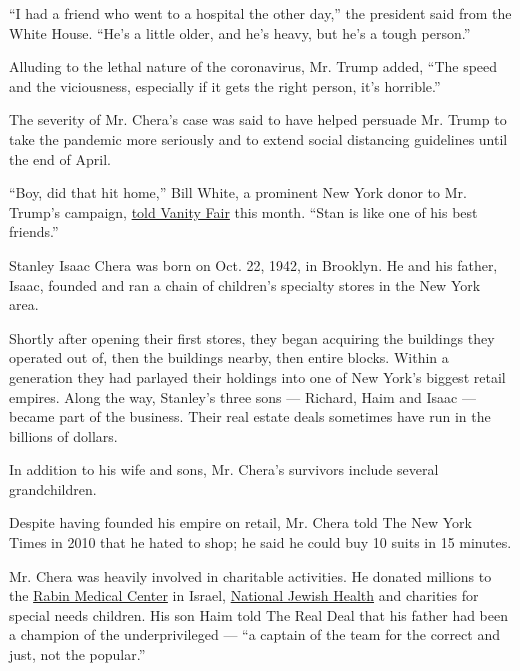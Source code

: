 ``I had a friend who went to a hospital the other day,'' the president
said from the White House. ``He's a little older, and he's heavy, but
he's a tough person.''

Alluding to the lethal nature of the coronavirus, Mr. Trump added, ``The
speed and the viciousness, especially if it gets the right person, it's
horrible.''

The severity of Mr. Chera's case was said to have helped persuade Mr.
Trump to take the pandemic more seriously and to extend social
distancing guidelines until the end of April.

``Boy, did that hit home,'' Bill White, a prominent New York donor to
Mr. Trump's campaign,
\href{https://www.vanityfair.com/news/2020/04/inside-trumps-decision-to-back-off-of-his-easter-coronavirus-miracle}{told
Vanity Fair} this month. ``Stan is like one of his best friends.''

Stanley Isaac Chera was born on Oct. 22, 1942, in Brooklyn. He and his
father, Isaac, founded and ran a chain of children's specialty stores in
the New York area.

Shortly after opening their first stores, they began acquiring the
buildings they operated out of, then the buildings nearby, then entire
blocks. Within a generation they had parlayed their holdings into one of
New York's biggest retail empires. Along the way, Stanley's three sons
--- Richard, Haim and Isaac --- became part of the business. Their real
estate deals sometimes have run in the billions of dollars.

In addition to his wife and sons, Mr. Chera's survivors include several
grandchildren.

Despite having founded his empire on retail, Mr. Chera told The New York
Times in 2010 that he hated to shop; he said he could buy 10 suits in 15
minutes.

Mr. Chera was heavily involved in charitable activities. He donated
millions to the
\href{https://hospitals.clalit.co.il/rabin/en/Pages/default.aspx}{Rabin
Medical Center} in Israel,
\href{https://www.nationaljewish.org/home}{National Jewish Health} and
charities for special needs children. His son Haim told The Real Deal
that his father had been a champion of the underprivileged --- ``a
captain of the team for the correct and just, not the popular.''

\href{https://www.nytimes.com/interactive/2020/obituaries/people-died-coronavirus-obituaries.html?action=click\&pgtype=Article\&state=default\&region=BELOW_MAIN_CONTENT\&context=covid_obits_promo}{}

